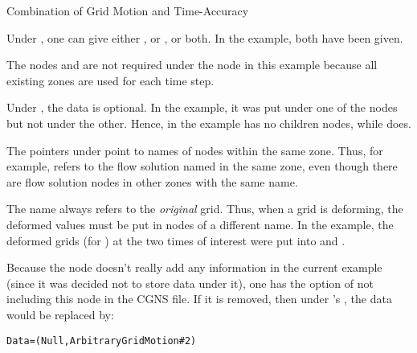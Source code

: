 \begin{example}{Combination of Grid Motion and Time-Accuracy}
\newpage
\begin{notes}
\item Under , one can give either
      , or , or both.
      In the example, both have been given.
\item The nodes  and  are not
      required under the  node in this example
      because all existing zones are used for each time step.
\item Under , the  data
      is optional.
      In the example, it was put under one of the nodes but not under
      the other.
      Hence,  in the example has no
      children nodes, while  does.
\item The pointers under  point to names of
      nodes within the same zone.
      Thus, for example,  refers to the flow solution
      named  in the same zone, even though there are flow
      solution nodes in other zones with the same name.
\item The name  always refers to the
      \emph{original} grid.
      Thus, when a grid is deforming, the deformed values must be put in
       nodes of a different name.
      In the example, the deformed grids (for ) at the two
      times of interest were put into  and
      .
\item Because the node  doesn't really
      add any information in the current example (since it was decided
      not to store  data under it), one has the option
      of not including this node in the CGNS file.
      If it is removed, then under 's ,
      the  data would be replaced by:
      \begin{alltt}
   Data = (Null, ArbitraryGridMotion\#2)
      \end{alltt}
\end{notes}
\end{example}
